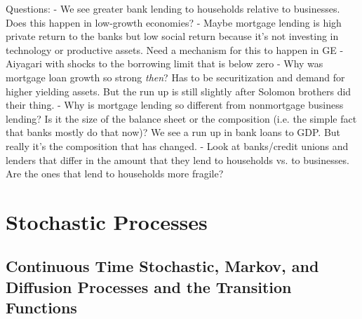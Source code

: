 \documentclass[12pt]{article}
\theoremstyle{plain}
\theoremstyle{definition}
\theoremstyle{remark}
\begin{document}
Questions:
- We see greater bank lending to households relative to businesses.
  Does this happen in low-growth economies?
- Maybe mortgage lending is high private return to the banks but low
  social return because it's not investing in technology or productive
  assets. Need a mechanism for this to happen in GE
- Aiyagari with shocks to the borrowing limit that is below zero
- Why was mortgage loan growth so strong \emph{then}? Has to be
  securitization and demand for higher yielding assets.
  But the run up is still slightly after Solomon brothers did their
  thing.
- Why is mortgage lending so different from nonmortgage business
  lending? Is it the size of the balance sheet or the composition (i.e.
  the simple fact that banks mostly do that now)?
  We see a run up in bank loans to GDP. But really it's the composition
  that has changed.
- Look at banks/credit unions and lenders that differ in the amount that
  they lend to households vs. to businesses. Are the ones that lend to
  households more fragile?


\clearpage
\section{Stochastic Processes}


\subsection{%
  Continuous Time Stochastic, Markov, and Diffusion Processes and the
  Transition Functions
}
\end{document}

